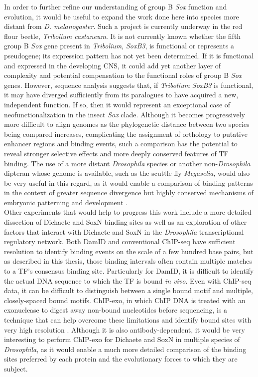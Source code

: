 In order to further refine our understanding of group B \emph{Sox} function and evolution, it would be useful to expand the work done here into species more distant from \emph{D. melanogaster}. Such a project is currently underway in the red flour beetle, \emph{Tribolium castaneum}. It is not currently known whether the fifth group B \emph{Sox} gene present in \emph{Tribolium}, \emph{SoxB3}, is functional or represents a pseudogene; its expression pattern has not yet been determined. If it is functional and expressed in the developing CNS, it could add yet another layer of complexity and potential compensation to the functional roles of group B \emph{Sox} genes. However, sequence analysis suggests that, if \emph{Tribolium SoxB3} is functional, it may have diverged sufficiently from its paralogues to have acquired a new, independent function. If so, then it would represent an exceptional case of neofunctionalization in the insect \emph{Sox} clade. Although it becomes progressively more difficult to align genomes as the phylogenetic distance between two species being compared increases, complicating the assignment of orthology to putative enhancer regions and binding events, such a comparison has the potential to reveal stronger selective effects and more deeply conserved features of TF binding. The use of a more distant \emph{Drosophila} species or another non-\emph{Drosophila} dipteran whose genome is available, such as the scuttle fly \emph{Megaselia}, would also be very useful in this regard, as it would enable a comparison of binding patterns in the context of greater sequence divergence but highly conserved mechanisms of embryonic patterning and development \citep{hare_sepsid_2008}.\\

Other experiments that would help to progress this work include a more detailed dissection of Dichaete and SoxN binding sites as well as an exploration of other factors that interact with Dichaete and SoxN in the \emph{Drosophila} transcriptional regulatory network. Both DamID and conventional ChIP-seq have sufficient resolution to identify binding events on the scale of a few hundred base pairs, but as described in this thesis, those binding intervals often contain multiple matches to a TF’s consensus binding site. Particularly for DamID, it is difficult to identify the actual DNA sequence to which the TF is bound \emph{in vivo}. Even with ChIP-seq data, it can be difficult to distinguish between a single bound motif and multiple, closely-spaced bound motifs. ChIP-exo, in which ChIP DNA is treated with an exonuclease to digest away non-bound nucleotides before sequencing, is a technique that can help overcome these limitations and identify bound sites with very high resolution \citep{bardet_identification_2013,rhee_comprehensive_2011}. Although it is also antibody-dependent, it would be very interesting to perform ChIP-exo for Dichaete and SoxN in multiple species of \emph{Drosophila}, as it would enable a much more detailed comparison of the binding sites preferred by each protein and the evolutionary forces to which they are subject.\\

